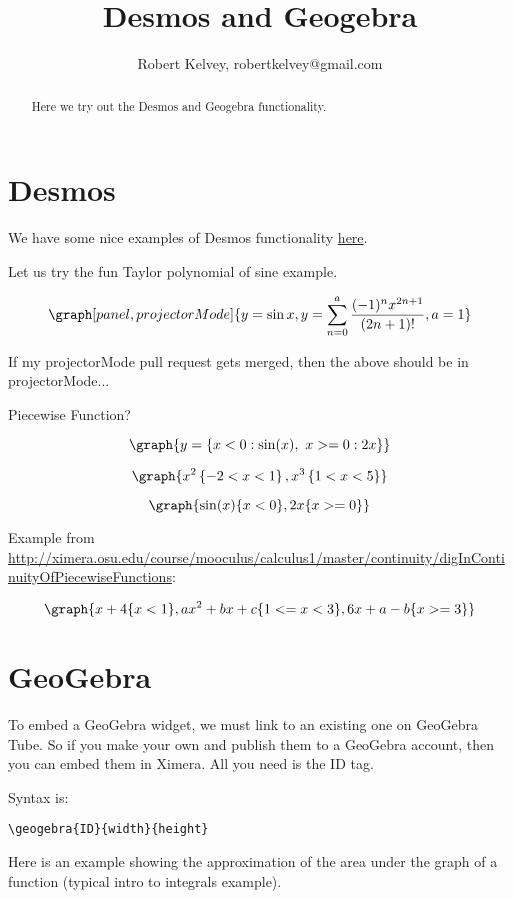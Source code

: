 \documentclass{ximera}
\title{Desmos and Geogebra}
\author{Robert Kelvey, robertkelvey@gmail.com}
\begin{document}
\begin{abstract}
Here we try out the Desmos and Geogebra functionality.
\end{abstract}
\maketitle

\section{Desmos}

We have some nice examples of Desmos functionality  \href{http://ximera.osu.edu/course/jackschmidt/ximeraActivity/master/desmos}{here}. 

Let us try the fun Taylor polynomial of sine example.

\[
    \graph[panel, projectorMode]{y=\sin x, y=\sum _{n=0}^a\frac{(-1)^n x^{2n+1}}{(2n+1)!}, a=1}
\]

If my projectorMode pull request gets merged, then the above should be in projectorMode...


Piecewise Function?

\[
   \graph{ y=\left\{x<0:\sin (x),\ x>=0:2x\right\} }
\]

\[
    \graph{ x^2\left\{-2 < x < 1 \right\}, x^3 \left\{1<x<5\right\}}
\]

\[
    \graph{ \sin(x)\{x<0\}, 2x\{ x>=0 \} }
\]

Example from \href{Calculus1}{http://ximera.osu.edu/course/mooculus/calculus1/master/continuity/digInContinuityOfPiecewiseFunctions}:

\[
       \graph{ x+4\{x<1\}, ax^2+bx+c\{1<= x < 3\}, 6x+a-b\{x>=3\} }
\]


\section{GeoGebra}

To embed a GeoGebra widget, we must link to an existing one on GeoGebra Tube. So if you make your own and publish them to a GeoGebra account, then you can embed them in Ximera. All you need is the ID tag.

Syntax is: \begin{verbatim}\geogebra{ID}{width}{height} \end{verbatim}

Here is an example showing the approximation of the area under the graph of a function (typical intro to integrals example).

\end{document}
